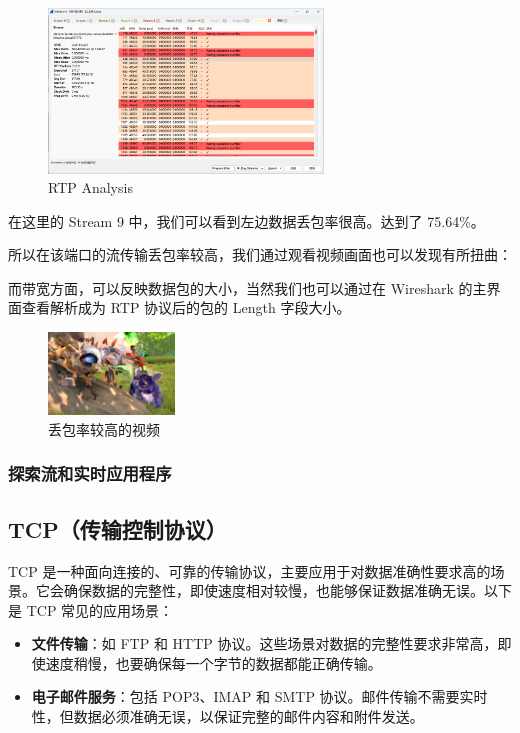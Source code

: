 \documentclass[14pt,a4paper,UTF8,twoside]{article}
\begin{document}
\begin{figure}[H]
    \centering
    \includegraphics[width=0.65\textwidth]{lab5/Analysis.png}
    \caption{RTP Analysis}
\end{figure}

在这里的 Stream 9 中，我们可以看到左边数据丢包率很高。达到了 75.64\%。

所以在该端口的流传输丢包率较高，我们通过观看视频画面也可以发现有所扭曲：

而带宽方面，可以反映数据包的大小，当然我们也可以通过在 Wireshark 的主界面查看解析成为 RTP 协议后的包的 Length 字段大小。

\begin{figure}[H]
    \centering
    \includegraphics[width=0.3\textwidth]{lab5/6.png}
    \caption{丢包率较高的视频}
\end{figure}

\subsubsection{探索流和实时应用程序}

\subsection*{TCP（传输控制协议）}
TCP 是一种面向连接的、可靠的传输协议，主要应用于对数据准确性要求高的场景。它会确保数据的完整性，即使速度相对较慢，也能够保证数据准确无误。以下是 TCP 常见的应用场景：
\begin{itemize}
    \item \textbf{文件传输}：如 FTP 和 HTTP 协议。这些场景对数据的完整性要求非常高，即使速度稍慢，也要确保每一个字节的数据都能正确传输。
    \item \textbf{电子邮件服务}：包括 POP3、IMAP 和 SMTP 协议。邮件传输不需要实时性，但数据必须准确无误，以保证完整的邮件内容和附件发送。
\end{itemize}
\end{document}
